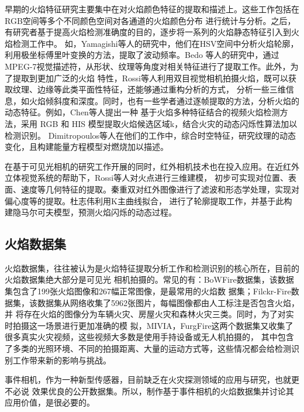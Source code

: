 早期的火焰特征研究主要集中在对火焰颜色特征的提取和描述上。这些工作包括在RGB空间等\cite{chen2004early,marbach2006image,rudz2013investigation}多个不同颜色空间对各通道的火焰颜色分布
进行统计与分析。之后，有研究者基于提高火焰检测准确度的目的，逐步将一系列的火焰静态特征引入到火焰检测工作中。
如，Yamagishi等人\cite{yamagishi2000contour}的研究中，他们在HSV空间中分析火焰轮廓，利用极坐标傅里叶变换的方法，提取了波动频率。Bedo
等人\cite{bedo2015techniques}的研究中，通过MPEG-7视觉描述符，从形状、纹理等角度对相关特征进行了提取工作。此外，为了提取到更加广泛的火焰
特性，Rossi等人\cite{rossi2011use}利用双目视觉相机拍摄火焰，既可以获取纹理、边缘等此类平面性特征，还能够通过重构分析的方式，
分析一些三维信息，如火焰倾斜度和深度。同时，也有一些学者通过逐帧提取的方法，分析火焰的动态特征。例如，Chen等人\cite{2011Application}提出一种
基于火焰多种特征结合的视频火焰检测方法，采用 RGB 和 HIS 模型提取火焰候选区域k，结合火灾的动态闪烁性算法加以检测识别。
Dimitropoulos等人\cite{dimitropoulos2014spatio}在他们的工作中，综合时空特征，研究纹理的动态变化，且构建能量方程模型对燃烧加以描述。

在基于可见光相机的研究工作开展的同时，红外相机技术也在投入应用。在近红外立体视觉系统的帮助下，Rossi等人\cite{rossi2013estimation}对火点进行三维建模，
初步可实现对位置、表面、速度等几何特征的提取。秦重双\cite{qcs}对红外图像进行了滤波和形态学处理，实现对偏心度等的提取。杜志伟\cite{dzw}利用K主曲线拟合，
进行了轮廓提取工作，并基于此构建隐马尔可夫模型，预测火焰闪烁的动态过程。

\subsection{火焰数据集}

火焰数据集，往往被认为是火焰特征提取分析工作和检测识别的核心所在，目前的火焰数据集绝大部分是可见光
相机拍摄的\cite{ko2012wildfire}。常见的有：BoWFire数据集，该数据集包含了199张火焰图像和267幅正常图像，是最常用的火焰数
据集\cite{chino2015bowfire}；Filckr-Fire数据集，该数据集从网络收集了5962张图片，每幅图像都由人工标注是否包含火焰，并
将存在火焰的图像分为车辆火灾、房屋火灾和森林火灾三类\cite{bedo2015techniques}。同时，为了对实时拍摄这一场景进行更加准确的模
拟，MIVIA，FurgFire这两个数据集又收集了很多真实火灾视频，这些视频大多数是使用手持设备或无人机拍摄的，
其中包含了多类的光照环境、不同的拍摄距离、大量的运动方式等，这些情况都会给检测识别工作带来新的影响与挑战。

事件相机，作为一种新型传感器，目前缺乏在火灾探测领域的应用与研究，也就更不必说
效果优良的公开数据集。所以，制作基于事件相机的火焰数据集并讨论其应用价值，是很必要的。

